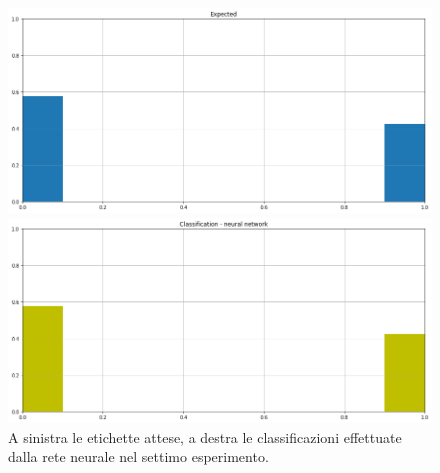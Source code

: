 \documentclass[12pt]{report}
\theoremstyle{definition}
\begin{document}
\begin{figure}
\centering
    \begin{minipage}{0.48\textwidth}
        \includegraphics[width=\linewidth]{images/experiment_kaggle/expected_classification.png}
    \end{minipage}
    \begin{minipage}{0.48\textwidth}
        \includegraphics[width=\linewidth]{images/experiment_kaggle/prediction_classification_nn.png}
    \end{minipage}
    \caption{A sinistra le etichette attese, a destra le classificazioni effettuate dalla rete neurale nel settimo esperimento.}
    \label{nn_exp7}
\end{figure} 
\end{document}
